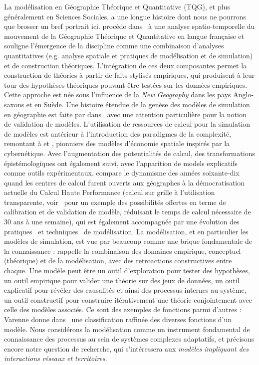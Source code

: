{}{
La modélisation en Géographie Théorique et Quantitative (TQG), et plus généralement en Sciences Sociales, a une longue histoire dont nous ne pourrons que brosser un bref portrait ici.  procède dans~\cite{cuyala2014analyse} à une analyse spatio-temporelle du mouvement de la Géographie Théorique et Quantitative en langue française et souligne l'émergence de la discipline comme une combinaison d'analyses quantitatives (e.g. analyse spatiale et pratiques de modélisation et de simulation) et de construction théoriques. L'intégration de ces deux composantes permet la construction de théories à partir de faits stylisés empiriques, qui produisent à leur tour des hypothèses théoriques pouvant être testées sur les données empiriques. Cette approche est née sous l'influence de la \emph{New Geography} dans les pays Anglo-saxons et en Suède. Une histoire étendue de la genèse des modèles de simulation en géographie est faite par  dans~\cite{rey2015plateforme} avec une attention particulière pour la notion de validation de modèles. L'utilisation de ressources de calcul pour la simulation de modèles est antérieur à l'introduction des paradigmes de la complexité, remontant à  et , pionniers des modèles d'économie spatiale inspirés par la cybernétique. Avec l'augmentation des potentialités de calcul, des transformations épistémologiques ont également suivi, avec l'apparition de models explicatifs comme outils expérimentaux.  compare le dynamisme des années soixante-dix quand les centres de calcul furent ouverts aux géographes à la démocratisation actuelle du Calcul Haute Performance (calcul sur grille à l'utilisation transparente, voir~\cite{schmitt2014half} pour un exemple des possibilités offertes en terme de calibration et de validation de modèle, réduisant le temps de calcul nécessaire de 30 ans à une semaine), qui est également accompagnée par une évolution des pratiques~\cite{banos2013pour} et techniques~\cite{10.1371/journal.pone.0138212} de modélisation. La modélisation, et en particulier les modèles de simulation, est vue par beaucoup comme une brique fondamentale de la connaissance : \cite{livet2010} rappelle la combinaison des domaines empirique, conceptuel (théorique) et de la modélisation, avec des retroactions constructives entre chaque. Une modèle peut être un outil d'exploration pour tester des hypothèses, un outil empirique pour valider une théorie sur des jeux de données, un outil explicatif pour révéler des causalités et ainsi des processus internes au système, un outil constructif pour construire itérativement une théorie conjointement avec celle des modèles associés. Ce sont des exemples de fonctions parmi d'autres : Varenne donne dans~\cite{varenne2010simulations} une classification raffinée des diverses fonctions d'un modèle. Nous considérons la modélisation comme un instrument fondamental de connaissance des processus au sein de systèmes complexes adaptatifs, et précisons encore notre question de recherche, qui s'intéressera aux \emph{modèles impliquant des interactions réseaux et territoires}.
}


